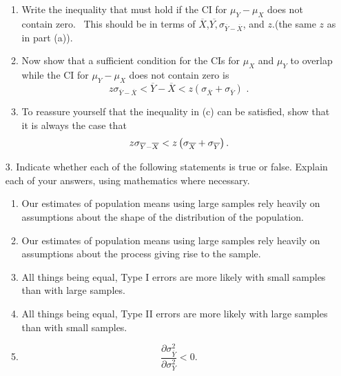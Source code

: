\documentclass[11pt]{article}
\begin{document}
\begin{enumerate}
\begin{enumerate}
\item Write the inequality that must hold if the CI for $\mu _{Y}-\mu _{X}$
does not contain zero. \ This should be in terms of $\overline{X}$,$%
\overline{Y,}\sigma _{\overline{Y}-\overline{X}}$, and $z.$(the same $z$ as
in part (a)). \ \bigskip

\item Now show that a sufficient condition for the CIs for $\mu _{X}$ and $%
\mu _{Y}$ to overlap while the CI for $\mu _{Y}-\mu _{X}$ does not contain
zero is%
\begin{equation*}
z\sigma _{\overline{Y}-\overline{X}}<\overline{Y}-\overline{X}<z\left(
\sigma _{\overline{X}}+\sigma _{\overline{Y}}\right) \text{ .}
\end{equation*}

\item To reassure yourself that the inequality in (c) can be satisfied, show
that it is always the case that 
\begin{equation*}
z\sigma _{\overline{Y}-\overline{X}}<z\left( \sigma _{\overline{X}}+\sigma _{%
\overline{Y}}\right) .
\end{equation*}%
\newpage
\end{enumerate}

\item[3.] Indicate whether each of the following statements is true or
false. Explain each of your answers, using mathematics where necessary.

\begin{enumerate}
\item Our estimates of population means using large samples rely heavily on
assumptions about the shape of the distribution of the population.

\item Our estimates of population means using large samples rely heavily on
assumptions about the process giving rise to the sample.

\item All things being equal, Type I errors are more likely with small
samples than with large samples.

\item All things being equal, Type II errors are more likely with large
samples than with small samples.

\item 
\begin{equation*}
\frac{\partial \sigma _{\overline{Y}}^{2}}{\partial \sigma _{Y}^{2}}<0.
\end{equation*}


\end{enumerate}
\end{enumerate}
\end{document}
